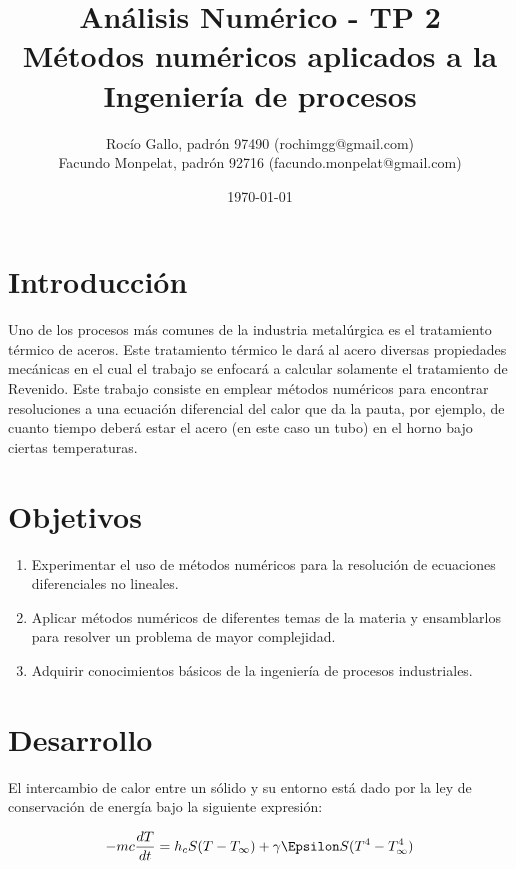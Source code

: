 \documentclass[10pt,a4paper]{article}
\title{%
  Análisis Numérico - TP 2 \\
  \large Métodos numéricos aplicados a la Ingeniería de procesos}
\author{Rocío Gallo, padrón 97490 (rochimgg@gmail.com)\\ Facundo Monpelat, padrón 92716 (facundo.monpelat@gmail.com)}
\date{\today} %
\begin{document}

\maketitle %

\section{Introducción}
Uno de los procesos más comunes de la industria metalúrgica es el tratamiento térmico de
aceros. Este tratamiento térmico le dará al acero diversas propiedades mecánicas en el cual el trabajo se enfocará a calcular solamente el tratamiento de Revenido. Este trabajo consiste en emplear métodos numéricos para encontrar resoluciones a una ecuación diferencial del calor que da la pauta, por ejemplo, de cuanto tiempo deberá estar el acero (en este caso un tubo) en el horno bajo ciertas temperaturas.


\section{Objetivos}
\begin{enumerate}
\item Experimentar el uso de métodos numéricos para la resolución de ecuaciones diferenciales
no lineales.
\item Aplicar métodos numéricos de diferentes temas de la materia y ensamblarlos para
resolver un problema de mayor complejidad.
\item Adquirir conocimientos básicos de la ingeniería de procesos industriales.
\end{enumerate}

\section{Desarrollo}
El intercambio de calor entre un sólido y su entorno está dado por la ley de conservación de
energía bajo la siguiente expresión:

\begin{equation}
\nonumber -mc\dfrac{dT}{dt}=h_{c}S(T-T_{\infty})+\gamma \Epsilon S(T^{4}-T_{\infty}^{4})
\end{equation}
\end{document}
